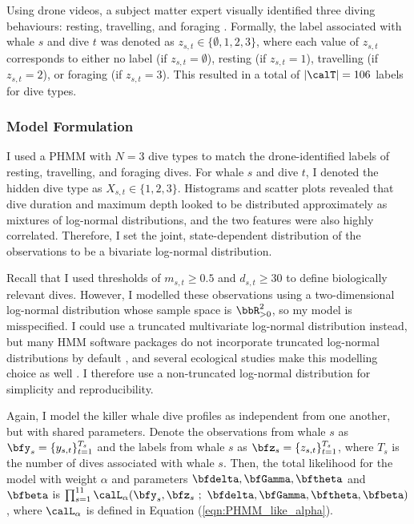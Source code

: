 Using drone videos, a subject matter expert visually identified three diving behaviours: resting, travelling, and foraging \citep[classification criteria are given in Table 2 of][]{McRae:2024}. Formally, the label associated with whale $s$ and dive $t$ was denoted as $z_{s,t} \in \{\emptyset,1,2,3\}$, where each value of $z_{s,t}$ corresponds to either no label (if $z_{s,t} = \emptyset$), resting (if $z_{s,t} = 1$), travelling (if $z_{s,t} = 2$), or foraging (if $z_{s,t} = 3$). This resulted in a total of $|\calT| = 106$ labels for dive types. 

\subsubsection{Model Formulation}

I used a PHMM with $N = 3$ dive types to match the drone-identified labels of resting, travelling, and foraging dives. For whale $s$ and dive $t$, I denoted the hidden dive type as $X_{s,t} \in \{1,2,3\}$. 
%
Histograms and scatter plots revealed that dive duration and maximum depth looked to be distributed approximately as mixtures of log-normal distributions, and the two features were also highly correlated. Therefore, I set the joint, state-dependent distribution of the observations to be a bivariate log-normal distribution. 

Recall that I used thresholds of $m_{s,t} \geq 0.5$ and $d_{s,t} \geq 30$ to define biologically relevant dives. However, I modelled these observations using a two-dimensional log-normal distribution whose sample space is $\bbR_{>0}^2$, so my model is misspecified. I could use a truncated multivariate log-normal distribution instead, but many HMM software packages do not incorporate truncated log-normal distributions by default \citep{McClintock:2018,Visser:2010}, and several ecological studies make this modelling choice as well \citep{Barajas:2017, Quick:2017, Tennessen:2019b}. I therefore use a non-truncated log-normal distribution for simplicity and reproducibility. %

Again, I model the killer whale dive profiles as independent from one another, but with shared parameters. Denote the observations from whale $s$ as $\bfy_s = \{y_{s,t}\}_{t=1}^{T_s}$ and the labels from whale $s$ as $\bfz_s = \{z_{s,t}\}_{t=1}^{T_s}$, where $T_s$ is the number of dives associated with whale $s$. Then, the total likelihood for the model with weight $\alpha$ and parameters $\bfdelta, \bfGamma, \bftheta$ and $\bfbeta$ is $\prod_{s=1}^{11} \calL_\alpha (\bfy_s,\bfz_s ~;~ \bfdelta, \bfGamma, \bftheta, \bfbeta)$, where $\calL_\alpha$ is defined in Equation (\ref{eqn:PHMM_like_alpha}).

